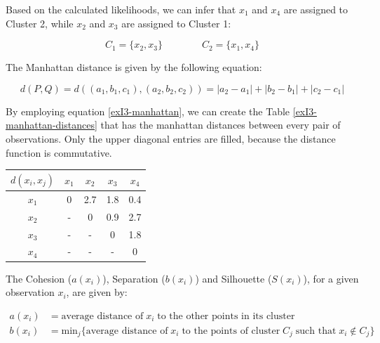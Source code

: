\documentclass[12pt]{article}
\begin{document}
\begin{enumerate}[leftmargin=\labelsep]
        Based on the calculated likelihoods, we can infer that $x_1$ and $x_4$ are assigned to Cluster 2, while $x_2$ and $x_3$ are assigned to Cluster 1:

        \vskip -0.3cm
        \begin{equation*}
          C_1 = \{x_2, x_3\} \qquad\qquad C_2 = \{x_1, x_4\}
        \end{equation*}

        The Manhattan distance is given by the following equation:

        \begin{equation}\label{exI3-manhattan}
          d(P, Q) = d((a_1, b_1, c_1), (a_2, b_2, c_2))= |a_2 - a_1| + |b_2 - b_1| + |c_2 - c_1|
        \end{equation}

        By employing equation \eqref{exI3-manhattan}, we can create the Table \ref{exI3-manhattan-distances} that has the manhattan
        distances between every pair of observations. Only the upper diagonal entries are filled, because the distance function is commutative.

        \begin{center}
          \captionsetup{type=table}
          \begin{tabular}{c|cccc}
            $d(x_i, x_j)$ & $x_1$ & $x_2$ & $x_3$ & $x_4$ \\
            \hline
            $x_1$         & 0     & 2.7   & 1.8   & 0.4   \\
            $x_2$         & -     & 0     & 0.9   & 2.7   \\
            $x_3$         & -     & -     & 0     & 1.8   \\
            $x_4$         & -     & -     & -     & 0
          \end{tabular}
          \label{exI3-manhattan-distances}
        \end{center}

        The Cohesion ($a(x_i)$), Separation ($b(x_i)$) and Silhouette ($S(x_i)$), for a given observation $x_i$, are given by:

        \vskip -0.3cm
        \begin{equation*}
          \begin{aligned}
            a(x_i) & = \text{average distance of} \; x_i \; \text{to the other points in its cluster}                                                    \\
            b(x_i) & = \text{min}_j\{\text{average distance of} \; x_i \; \text{to the points of cluster} \; C_j \; \text{such that} \; x_i \notin C_j\}
          \end{aligned}
        \end{equation*}


\end{enumerate}
\end{document}
